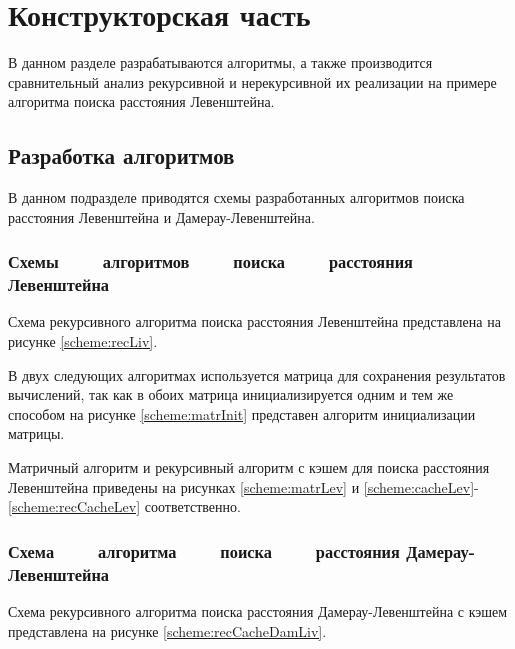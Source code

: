 \chapter{Конструкторская часть}

В данном разделе разрабатываются алгоритмы, а также производится сравнительный
анализ рекурсивной и нерекурсивной их реализации на примере алгоритма поиска
расстояния Левенштейна.

\section{Разработка алгоритмов}

В данном подразделе приводятся схемы разработанных алгоритмов поиска расстояния
Левенштейна и Дамерау-Левенштейна.

\subsection[Схемы алгоритмов поиска расстояния Левенштейна]
           {Схемы ~~~~алгоритмов ~~~~поиска ~~~~расстояния Левенштейна}

Схема рекурсивного алгоритма поиска расстояния Левенштейна представлена
на рисунке \ref{scheme:recLiv}.
\noindent
{}

В двух следующих алгоритмах используется матрица для сохранения результатов
вычислений, так как в обоих матрица инициализируется одним и тем же способом
на рисунке \ref{scheme:matrInit} представен алгоритм инициализации матрицы.
\noindent
{}

Матричный алгоритм и рекурсивный алгоритм с кэшем для поиска расстояния
Левенштейна приведены на рисунках \ref{scheme:matrLev} и
\ref{scheme:cacheLev}-\ref{scheme:recCacheLev} соответственно.

\noindent
{}
\noindent
{}
\noindent
{}

\subsection[Схема алгоритма поиска расстояния Дамерау-Левенштейна]
           {Схема ~~~~алгоритма ~~~~поиска ~~~~расстояния Дамерау-Левенштейна}

Схема рекурсивного алгоритма поиска расстояния Дамерау-Левенштейна с кэшем
представлена на рисунке \ref{scheme:recCacheDamLiv}.
\noindent
{}

